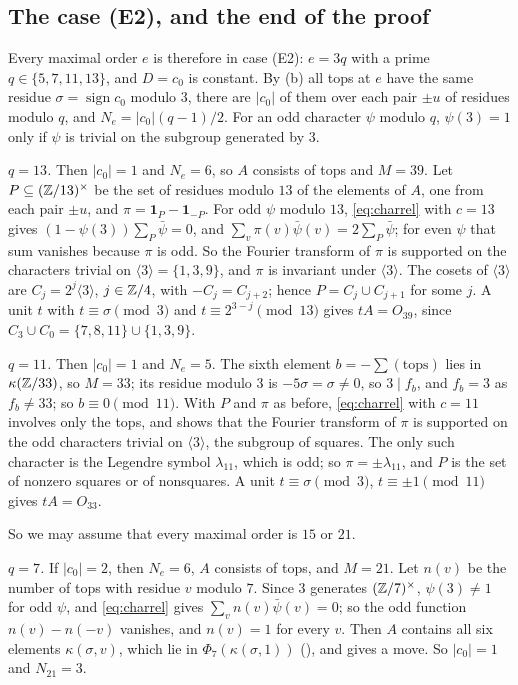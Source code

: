 \subsection{The case (E2), and the end of the proof}
Every maximal order $e$ is therefore in case (E2): $e=3q$ with a prime
$q\in\{5,7,11,13\}$, and $D=c_{0}$ is constant. By (b) all
tops at $e$ have the same residue $\sigma=\operatorname{sign}c_{0}$ modulo
$3$, there are $|c_{0}|$ of them over each pair $\pm u$ of residues modulo
$q$, and $N_{e}=|c_{0}|(q-1)/2$. For an odd character $\psi$ modulo $q$,
$\psi(3)=1$ only if $\psi$ is trivial on the subgroup generated by $3$.

\emph{$q=13$.} Then $|c_{0}|=1$ and $N_{e}=6$, so $A$ consists of tops and
$M=39$. Let $P\subseteq(\mathbb{Z}/13)^{\times}$ be the set of residues modulo $13$
of the elements of $A$, one from each pair $\pm u$, and
$\pi=\mathbf 1_{P}-\mathbf 1_{-P}$. For odd $\psi$ modulo $13$,
\eqref{eq:charrel} with $c=13$ gives $(1-\psi(3))\sum_{P}\bar\psi=0$, and
$\sum_{v}\pi(v)\bar\psi(v)=2\sum_{P}\bar\psi$; for even $\psi$ that sum
vanishes because $\pi$ is odd. So the Fourier transform of $\pi$ is
supported on the characters trivial on $\langle3\rangle=\{1,3,9\}$, and
$\pi$ is invariant under $\langle3\rangle$. The cosets of $\langle3\rangle$
are $C_{j}=2^{j}\langle3\rangle$, $j\in\mathbb{Z}/4$, with $-C_{j}=C_{j+2}$; hence
$P=C_{j}\cup C_{j+1}$ for some $j$. A unit $t$ with $t\equiv\sigma\pmod3$
and $t\equiv2^{3-j}\pmod{13}$ gives $tA=O_{39}$, since $C_{3}\cup
C_{0}=\{7,8,11\}\cup\{1,3,9\}$.

\emph{$q=11$.} Then $|c_{0}|=1$ and $N_{e}=5$. The sixth element
$b=-\sum(\text{tops})$ lies in $\kappa(\mathbb{Z}/33)$, so $M=33$; its residue
modulo $3$ is $-5\sigma=\sigma\ne0$, so $3\mid f_{b}$, and $f_{b}=3$ as
$f_{b}\ne33$; so $b\equiv0\pmod{11}$. With $P$ and $\pi$ as before,
\eqref{eq:charrel} with $c=11$ involves only the tops, and shows that the
Fourier transform of $\pi$ is supported on the odd characters trivial on
$\langle3\rangle$, the subgroup of squares. The only such character is the
Legendre symbol $\lambda_{11}$, which is odd; so $\pi=\pm\lambda_{11}$, and
$P$ is the set of nonzero squares or of nonsquares. A unit
$t\equiv\sigma\pmod3$, $t\equiv\pm1\pmod{11}$ gives $tA=O_{33}$.

So we may assume that every maximal order is $15$ or $21$.

\emph{$q=7$.} If $|c_{0}|=2$, then $N_{e}=6$, $A$ consists of tops, and
$M=21$. Let $n(v)$ be the number of tops with residue $v$ modulo $7$. Since
$3$ generates $(\mathbb{Z}/7)^{\times}$, $\psi(3)\ne1$ for odd $\psi$, and
\eqref{eq:charrel} gives $\sum_{v}n(v)\bar\psi(v)=0$; so the odd function
$n(v)-n(-v)$ vanishes, and $n(v)=1$ for every $v$. Then $A$ contains all six
elements $\kappa(\sigma,v)$, which lie in $\Phi_{7}(\kappa(\sigma,1))$
(), and  gives a move. So $|c_{0}|=1$
and $N_{21}=3$.

